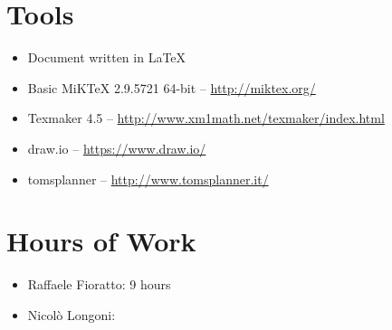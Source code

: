 \newpage
\begin{appendices}
\section{Tools}
\begin{itemize}
	\item Document written in \LaTeX
	\item Basic MiKTeX 2.9.5721 64-bit -- \url{http://miktex.org/}
	\item Texmaker 4.5 -- \url{http://www.xm1math.net/texmaker/index.html}
	\item draw.io -- \url{https://www.draw.io/}
	\item tomsplanner -- \url{http://www.tomsplanner.it/}
\end{itemize}
\break
\section{Hours of Work}
\begin{itemize}
	\item Raffaele Fioratto: 9 hours
	\item Nicol\`{o} Longoni: 
\end{itemize}
\end{appendices}